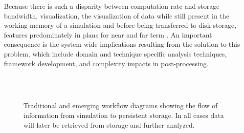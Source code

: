 Because there is such a disparity between computation rate and storage
bandwidth, \insitu visualization, the visualization of data while still
present in the working memory of a simulation and before being transferred
to disk storage, features predominately in plans for near and far term
\vda{}.
An important consequence is the system wide implications resulting from the
solution to this problem, which include domain and technique specific
analysis techniques, \insitu framework development, and complexity impacts
in post-processing.

\begin{figure}
  \centering
   \\
   \\
  \caption[Visualization and data analysis workflows.]{Traditional and
    emerging workflow diagrams showing the flow of information from
    simulation to persistent storage.  In all cases data will later be
    retrieved from storage and further analyzed.}
  \label{fig:Workflows}
\end{figure}


